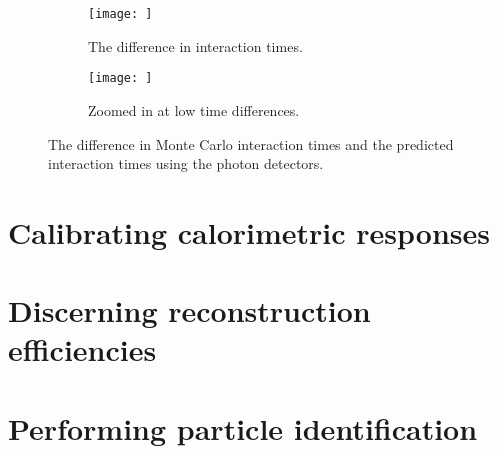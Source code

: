 \begin{figure}[h!]
  \centering
  \begin{subfigure}{0.45\textwidth}
    \centering
    \texttt{[image: ]}
    \caption{The difference in interaction times.}
  \end{subfigure}
  \hspace{0.08\textwidth}
  \begin{subfigure}{0.45\textwidth}
    \centering
    \texttt{[image: ]}
    \caption{Zoomed in at low time differences.}
  \end{subfigure}
  \caption[The difference in Monte Carlo interaction times and the predicted interaction times using the photon detectors]
          {The difference in Monte Carlo interaction times and the predicted interaction times using the photon detectors.}
          \label{fig:PD_MCPDDiff}
\end{figure}

\section{Calibrating calorimetric responses}  %

\section{Discerning reconstruction efficiencies} \label{sec:SimRecoEffic} %

\section{Performing particle identification}  %

